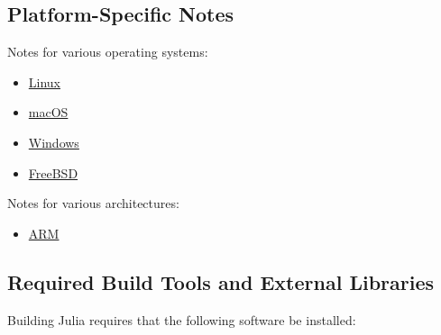 \hypertarget{12302666080168492498}{}


\subsection{Platform-Specific Notes}



Notes for various operating systems:



\begin{itemize}
\item \href{https://github.com/JuliaLang/julia/blob/master/doc/src/devdocs/build/linux.md}{Linux}


\item \href{https://github.com/JuliaLang/julia/blob/master/doc/src/devdocs/build/macos.md}{macOS}


\item \href{https://github.com/JuliaLang/julia/blob/master/doc/src/devdocs/build/windows.md}{Windows}


\item \href{https://github.com/JuliaLang/julia/blob/master/doc/src/devdocs/build/freebsd.md}{FreeBSD}

\end{itemize}


Notes for various architectures:



\begin{itemize}
\item \href{https://github.com/JuliaLang/julia/blob/master/doc/src/devdocs/build/arm.md}{ARM}

\end{itemize}


\hypertarget{13972737225468149107}{}


\subsection{Required Build Tools and External Libraries}



Building Julia requires that the following software be installed:




